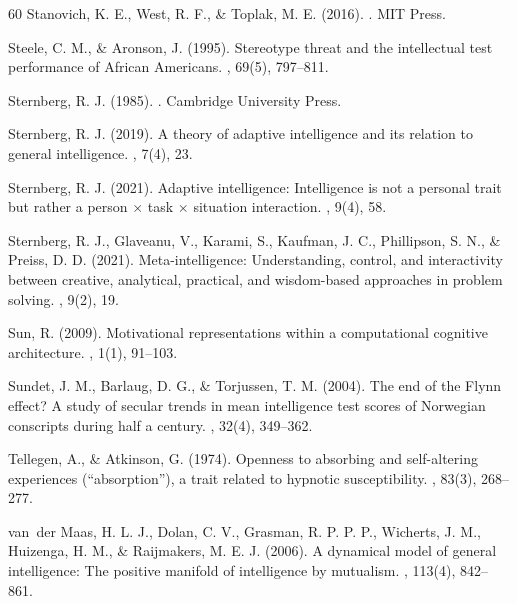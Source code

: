 \documentclass[12pt,a4paper]{article}
\begin{document}
\begin{thebibliography}{60}
Stanovich, K. E., West, R. F., \& Toplak, M. E. (2016).
.
\newblock MIT Press.

Steele, C. M., \& Aronson, J. (1995).
\newblock Stereotype threat and the intellectual test performance of African Americans.
, 69(5), 797--811.

Sternberg, R. J. (1985).
.
\newblock Cambridge University Press.

Sternberg, R. J. (2019).
\newblock A theory of adaptive intelligence and its relation to general intelligence.
, 7(4), 23.

Sternberg, R. J. (2021).
\newblock Adaptive intelligence: Intelligence is not a personal trait but rather a person $\times$ task $\times$ situation interaction.
, 9(4), 58.

Sternberg, R. J., Glaveanu, V., Karami, S., Kaufman, J. C., Phillipson, S. N., \& Preiss, D. D. (2021).
\newblock Meta-intelligence: Understanding, control, and interactivity between creative, analytical, practical, and wisdom-based approaches in problem solving.
, 9(2), 19.

Sun, R. (2009).
\newblock Motivational representations within a computational cognitive architecture.
, 1(1), 91--103.

Sundet, J. M., Barlaug, D. G., \& Torjussen, T. M. (2004).
\newblock The end of the Flynn effect? A study of secular trends in mean intelligence test scores of Norwegian conscripts during half a century.
, 32(4), 349--362.

Tellegen, A., \& Atkinson, G. (1974).
\newblock Openness to absorbing and self-altering experiences (``absorption''), a trait related to hypnotic susceptibility.
, 83(3), 268--277.

van~der Maas, H. L. J., Dolan, C. V., Grasman, R. P. P. P., Wicherts, J. M., Huizenga, H. M., \& Raijmakers, M. E. J. (2006).
\newblock A dynamical model of general intelligence: The positive manifold of intelligence by mutualism.
, 113(4), 842--861.


\end{thebibliography}
\end{document}
